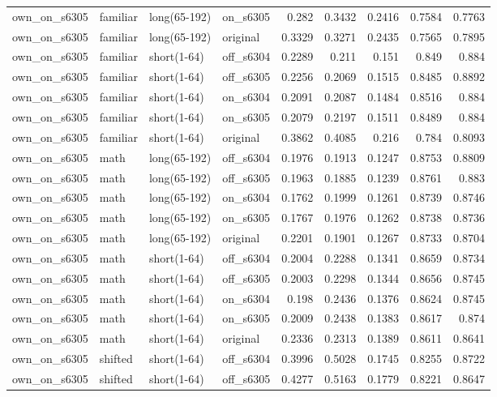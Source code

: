 \begin{table}
\begin{tabular}{llllrrrrr}
own\_on\_s6305 & familiar & long(65-192) & on\_s6305 & 0.282 & 0.3432 & 0.2416 & 0.7584 & 0.7763 \\
own\_on\_s6305 & familiar & long(65-192) & original & 0.3329 & 0.3271 & 0.2435 & 0.7565 & 0.7895 \\
own\_on\_s6305 & familiar & short(1-64) & off\_s6304 & 0.2289 & 0.211 & 0.151 & 0.849 & 0.884 \\
own\_on\_s6305 & familiar & short(1-64) & off\_s6305 & 0.2256 & 0.2069 & 0.1515 & 0.8485 & 0.8892 \\
own\_on\_s6305 & familiar & short(1-64) & on\_s6304 & 0.2091 & 0.2087 & 0.1484 & 0.8516 & 0.884 \\
own\_on\_s6305 & familiar & short(1-64) & on\_s6305 & 0.2079 & 0.2197 & 0.1511 & 0.8489 & 0.884 \\
own\_on\_s6305 & familiar & short(1-64) & original & 0.3862 & 0.4085 & 0.216 & 0.784 & 0.8093 \\
own\_on\_s6305 & math & long(65-192) & off\_s6304 & 0.1976 & 0.1913 & 0.1247 & 0.8753 & 0.8809 \\
own\_on\_s6305 & math & long(65-192) & off\_s6305 & 0.1963 & 0.1885 & 0.1239 & 0.8761 & 0.883 \\
own\_on\_s6305 & math & long(65-192) & on\_s6304 & 0.1762 & 0.1999 & 0.1261 & 0.8739 & 0.8746 \\
own\_on\_s6305 & math & long(65-192) & on\_s6305 & 0.1767 & 0.1976 & 0.1262 & 0.8738 & 0.8736 \\
own\_on\_s6305 & math & long(65-192) & original & 0.2201 & 0.1901 & 0.1267 & 0.8733 & 0.8704 \\
own\_on\_s6305 & math & short(1-64) & off\_s6304 & 0.2004 & 0.2288 & 0.1341 & 0.8659 & 0.8734 \\
own\_on\_s6305 & math & short(1-64) & off\_s6305 & 0.2003 & 0.2298 & 0.1344 & 0.8656 & 0.8745 \\
own\_on\_s6305 & math & short(1-64) & on\_s6304 & 0.198 & 0.2436 & 0.1376 & 0.8624 & 0.8745 \\
own\_on\_s6305 & math & short(1-64) & on\_s6305 & 0.2009 & 0.2438 & 0.1383 & 0.8617 & 0.874 \\
own\_on\_s6305 & math & short(1-64) & original & 0.2336 & 0.2313 & 0.1389 & 0.8611 & 0.8641 \\
own\_on\_s6305 & shifted & short(1-64) & off\_s6304 & 0.3996 & 0.5028 & 0.1745 & 0.8255 & 0.8722 \\
own\_on\_s6305 & shifted & short(1-64) & off\_s6305 & 0.4277 & 0.5163 & 0.1779 & 0.8221 & 0.8647 \\

\end{tabular}
\end{table}
